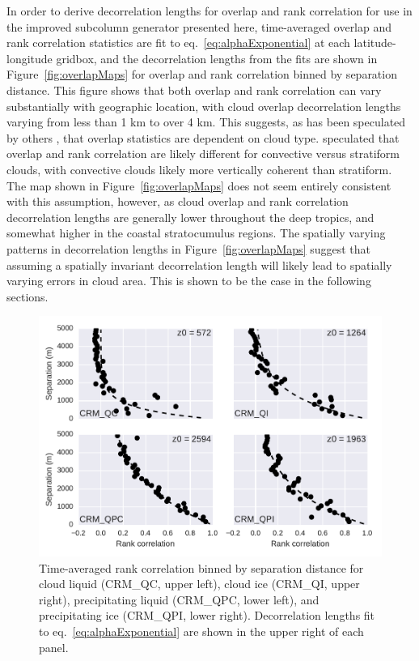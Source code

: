In order to derive decorrelation lengths for overlap and rank
correlation for use in the improved subcolumn generator presented here,
time-averaged overlap and rank correlation statistics are fit to
eq.~\ref{eq:alphaExponential} at each latitude-longitude gridbox, and
the decorrelation lengths from the fits are shown in
Figure~\ref{fig:overlapMaps} for overlap and rank correlation binned by
separation distance. This figure shows that both overlap and rank
correlation can vary substantially with geographic location, with cloud
overlap decorrelation lengths varying from less than 1 km to over 4 km.
This suggests, as has been speculated by others \citep[
e.g.]{pincus_et_al_2005}, that overlap statistics are dependent on cloud
type. \citet{pincus_et_al_2005} speculated that overlap and rank
correlation are likely different for convective versus stratiform
clouds, with convective clouds likely more vertically coherent than
stratiform. The map shown in Figure~\ref{fig:overlapMaps} does not seem
entirely consistent with this assumption, however, as cloud overlap and
rank correlation decorrelation lengths are generally lower throughout
the deep tropics, and somewhat higher in the coastal stratocumulus
regions. The spatially varying patterns in decorrelation lengths in
Figure~\ref{fig:overlapMaps} suggest that assuming a spatially invariant
decorrelation length will likely lead to spatially varying errors in
cloud area. This is shown to be the case in the following sections.

\begin{figure}[htbp]
\centering
\includegraphics{graphics/subgrid2_rankcorr_dz.pdf}
\caption{\label{fig:rankcorrScatter}Time-averaged rank correlation
binned by separation distance for cloud liquid (CRM\_QC, upper left),
cloud ice (CRM\_QI, upper right), precipitating liquid (CRM\_QPC, lower
left), and precipitating ice (CRM\_QPI, lower right). Decorrelation
lengths fit to eq.~\ref{eq:alphaExponential} are shown in the upper
right of each panel.}\label{fig:rankcorrScatter}
\end{figure}


